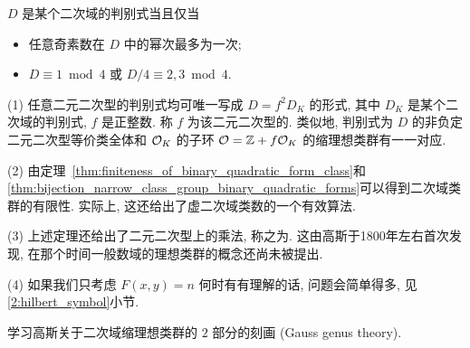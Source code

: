 \begin{exercise}
$D$ 是某个二次域的判别式当且仅当
\begin{itemize}
\item 任意奇素数在 $D$ 中的幂次最多为一次;
\item $D\equiv 1\bmod 4$ 或 $D/4\equiv 2,3\bmod 4$.
\end{itemize}
\end{exercise}

\begin{remark}
(1) 任意二元二次型的判别式均可唯一写成 $D=f^2D_K$ 的形式, 其中 $D_K$ 是某个二次域的判别式, $f$ 是正整数. 称 $f$ 为该二元二次型的. 类似地, 判别式为 $D$ 的非负定二元二次型等价类全体和 ${\mathcal{O}}_K$ 的子环 ${\mathcal{O}}={\mathbb{Z}}+f{\mathcal{O}}_K$ 的缩理想类群有一一对应.

(2) 由定理~\ref{thm:finiteness_of_binary_quadratic_form_class}和\ref{thm:bijection_narrow_class_group_binary_quadratic_forms}可以得到二次域类群的有限性. 实际上, 这还给出了虚二次域类数的一个有效算法.

(3) 上述定理还给出了二元二次型上的乘法, 称之为. 这由高斯于1800年左右首次发现, 在那个时间一般数域的理想类群的概念还尚未被提出.

(4) 如果我们只考虑 $F(x,y)=n$ 何时有有理解的话, 问题会简单得多, 见\ref{2:hilbert_symbol}小节.
\end{remark}


\begin{exercise}
学习高斯关于二次域缩理想类群的 $2$ 部分的刻画 (Gauss genus theory).
\end{exercise}





